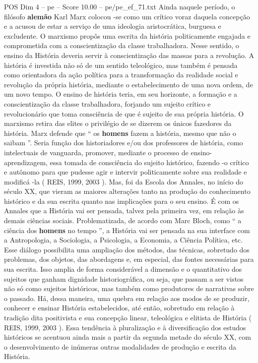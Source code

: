 \begin{textsample}{POS Dim 4 – pe – Score 10.00 – pe/pe\_ef\_71.txt}
Ainda naquele período, o filósofo \textbf{alemão} Karl Marx colocou -se como um crítico voraz daquela concepção e a acusou de estar a serviço de uma ideologia aristocrática, burguesa e excludente.
O marxismo propôs uma escrita da história politicamente engajada e comprometida com a conscientização da classe trabalhadora.
Nesse sentido, o ensino da História deveria servir à conscientização das massas para a revolução.
A história é investida não só de um sentido teleológico, mas também é pensada como orientadora da ação política para a transformação da realidade social e revolução da própria história, mediante o estabelecimento de uma nova ordem, de um novo tempo.
O ensino de história teria, em seu horizonte, a formação e a conscientização da classe trabalhadora, forjando um sujeito crítico e revolucionário que toma consciência de que é sujeito de sua própria história.
O marxismo retira das elites o privilégio de se dizerem os únicos fazedores da história.
Marx defende que “ os \textbf{homens} fazem a história, mesmo que não o saibam ”.
Seria função dos historiadores e/ou dos professores de história, como intelectuais de vanguarda, promover, mediante o processo de ensino-aprendizagem, essa tomada de consciência do sujeito histórico, fazendo -o crítico e autônomo para que pudesse agir e intervir politicamente sobre sua realidade e modificá -la ( REIS, 1999, 2003 ).
Mas, foi da Escola dos Annales, no início do século XX, que vieram as maiores alterações tanto na produção do conhecimento histórico e da sua escrita quanto nas implicações para o seu ensino.
É com os Annales que a História vai ser pensada, talvez pela primeira vez, em relação às demais ciências sociais.
Problematizada, de acordo com Marc Bloch, como “ a ciência dos \textbf{homens} no tempo ”, a História vai ser pensada na sua interface com a Antropologia, a Sociologia, a Psicologia, a Economia, a Ciência Política, etc.
Esse diálogo possibilita uma ampliação dos métodos, das técnicas, sobretudo dos problemas, dos objetos, das abordagens e, em especial, das fontes necessárias para sua escrita.
Isso amplia de forma considerável a dimensão e o quantitativo dos sujeitos que ganham dignidade historiográfica, ou seja, que passam a ser vistos não só como sujeitos históricos, mas também como produtores de narrativas sobre o passado.
Há, dessa maneira, uma quebra em relação aos modos de se produzir, conhecer e ensinar História estabelecidos, até então, sobretudo em relação à tradição dita positivista e sua concepção linear, teleológica e elitista de História ( REIS, 1999, 2003 ).
Essa tendência à pluralização e à diversificação dos estudos históricos se acentuou ainda mais a partir da segunda metade do século XX, com o desenvolvimento de inúmeras outras modalidades de produção e escrita da História.

\end{textsample}
